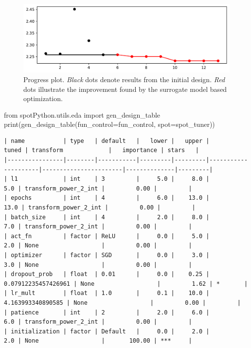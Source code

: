 \documentclass[
  letterpaper,
  DIV=11,
  numbers=noendperiod]{scrreprt}
\newenvironment{Shaded}{\begin{snugshade}}{\end{snugshade}}
\newcommand{\BuiltInTok}[1]{\textcolor[rgb]{0.00,0.23,0.31}{#1}}
\newcommand{\ImportTok}[1]{\textcolor[rgb]{0.00,0.46,0.62}{#1}}
\newcommand{\NormalTok}[1]{\textcolor[rgb]{0.00,0.23,0.31}{#1}}
\newcommand{\OperatorTok}[1]{\textcolor[rgb]{0.37,0.37,0.37}{#1}}
\begin{document}
\begin{figure}[H]

{\centering \includegraphics{31_spot_lightning_csv_files/figure-pdf/cell-13-output-1.pdf}

}

\caption{Progress plot. \emph{Black} dots denote results from the
initial design. \emph{Red} dots illustrate the improvement found by the
surrogate model based optimization.}

\end{figure}

\begin{Shaded}
\begin{Highlighting}[]
\ImportTok{from}\NormalTok{ spotPython.utils.eda }\ImportTok{import}\NormalTok{ gen\_design\_table}
\BuiltInTok{print}\NormalTok{(gen\_design\_table(fun\_control}\OperatorTok{=}\NormalTok{fun\_control, spot}\OperatorTok{=}\NormalTok{spot\_tuner))}
\end{Highlighting}
\end{Shaded}

\begin{verbatim}
| name           | type   | default   |   lower |   upper |               tuned | transform             |   importance | stars   |
|----------------|--------|-----------|---------|---------|---------------------|-----------------------|--------------|---------|
| l1             | int    | 3         |     5.0 |     8.0 |                 5.0 | transform_power_2_int |         0.00 |         |
| epochs         | int    | 4         |     6.0 |    13.0 |                13.0 | transform_power_2_int |         0.00 |         |
| batch_size     | int    | 4         |     2.0 |     8.0 |                 7.0 | transform_power_2_int |         0.00 |         |
| act_fn         | factor | ReLU      |     0.0 |     5.0 |                 2.0 | None                  |         0.00 |         |
| optimizer      | factor | SGD       |     0.0 |     3.0 |                 3.0 | None                  |         0.00 |         |
| dropout_prob   | float  | 0.01      |     0.0 |    0.25 | 0.07912235457426961 | None                  |         1.62 | *       |
| lr_mult        | float  | 1.0       |     0.1 |    10.0 |   4.163993340890585 | None                  |         0.00 |         |
| patience       | int    | 2         |     2.0 |     6.0 |                 6.0 | transform_power_2_int |         0.00 |         |
| initialization | factor | Default   |     0.0 |     2.0 |                 2.0 | None                  |       100.00 | ***     |
\end{verbatim}
\end{document}
